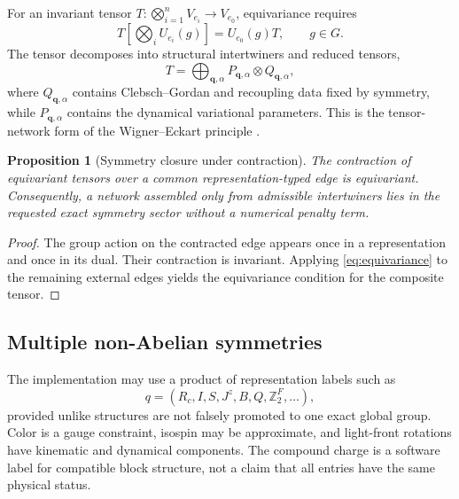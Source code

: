 \documentclass[11pt]{article}
\newtheorem{proposition}[definition]{Proposition}
\newcommand{\Jz}{J^z}
\begin{document}
For an invariant tensor
\(T:\bigotimes_{i=1}^{n}V_{e_i}\rightarrow V_{e_0}\), equivariance requires
\begin{equation}
 T\left[\bigotimes_i U_{e_i}(g)\right]
 =U_{e_0}(g)T,
 \qquad g\in G.
\label{eq:equivariance}
\end{equation}
The tensor decomposes into structural intertwiners and reduced tensors,
\begin{equation}
 T=
 \bigoplus_{\bm q,\alpha}
 P_{\bm q,\alpha}
 \otimes
 Q_{\bm q,\alpha},
\label{eq:symmetric-tensor-decomposition}
\end{equation}
where \(Q_{\bm q,\alpha}\) contains Clebsch--Gordan and recoupling data fixed by
symmetry, while \(P_{\bm q,\alpha}\) contains the dynamical variational
parameters.  This is the tensor-network form of the Wigner--Eckart principle
\cite{Singh2009,Weichselbaum2012}.

\begin{proposition}[Symmetry closure under contraction]
The contraction of equivariant tensors over a common representation-typed edge
is equivariant.  Consequently, a network assembled only from admissible
intertwiners lies in the requested exact symmetry sector without a numerical
penalty term.
\end{proposition}

\begin{proof}
The group action on the contracted edge appears once in a representation and
once in its dual.  Their contraction is invariant.  Applying
\cref{eq:equivariance} to the remaining external edges yields the equivariance
condition for the composite tensor.
\end{proof}

\subsection{Multiple non-Abelian symmetries}

The implementation may use a product of representation labels such as
\begin{equation}
 q=
 \left(
 R_c,
 I,
 S,
 \Jz,
 B,
 Q,
 \mathbb Z_2^{F},
 \ldots
 \right),
\label{eq:compound-charge}
\end{equation}
provided unlike structures are not falsely promoted to one exact global group.
Color is a gauge constraint, isospin may be approximate, and light-front
rotations have kinematic and dynamical components.  The compound charge is a
software label for compatible block structure, not a claim that all entries
have the same physical status.
\end{document}
